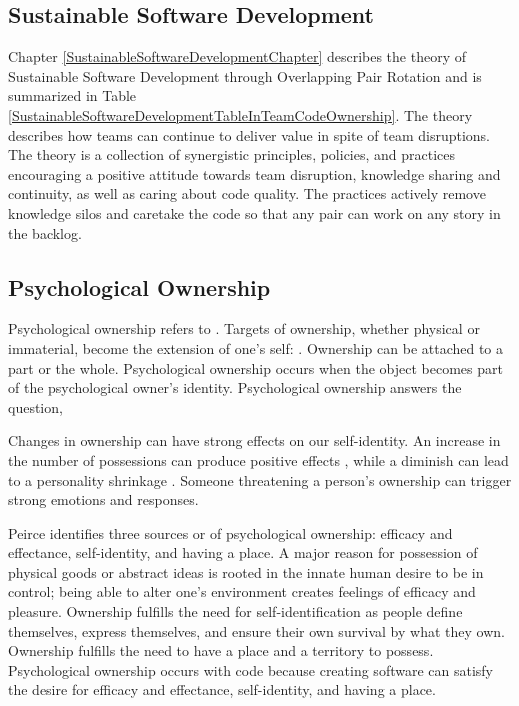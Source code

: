 \subsection{Sustainable Software Development}
\label{SustainableSoftwareDevelopmentTheory}
Chapter \ref{SustainableSoftwareDevelopmentChapter} describes the theory of Sustainable Software Development through Overlapping Pair Rotation and is summarized in Table \ref{SustainableSoftwareDevelopmentTableInTeamCodeOwnership}. The theory describes how teams can continue to deliver value in spite of team disruptions. The theory is a collection of synergistic principles, policies, and practices encouraging a positive attitude towards team disruption, knowledge sharing and continuity, as well as caring about code quality. The practices actively remove knowledge silos and caretake the code so that any pair can work on any story in the backlog. 

\subsection{Psychological Ownership}
Psychological ownership refers to  \cite{Pierce2001}. Targets of ownership, whether physical or immaterial, become the extension of one's self:  \cite{Isaacs1933}. Ownership can be attached to a part or the whole. Psychological ownership occurs when the object becomes part of the psychological owner's identity. Psychological ownership answers the question, 

Changes in ownership can have strong effects on our self-identity. An increase in the number of possessions can produce positive effects \cite{Formanek1994}, while a diminish can lead to a personality shrinkage \cite{James1890}. Someone threatening a person's ownership can trigger strong emotions and responses.

Peirce \cite{Pierce2001} identifies three sources or  of psychological ownership: efficacy and effectance, self-identity, and having a place. A major reason for possession of physical goods or abstract ideas is rooted in the innate human desire to be in control; being able to alter one's environment creates feelings of efficacy and pleasure. Ownership fulfills the need for self-identification as people define themselves, express themselves, and ensure their own survival by what they own. Ownership fulfills the need to have a place and a territory to possess.  Psychological ownership occurs with code because creating software can satisfy the desire for efficacy and effectance, self-identity, and having a place.

